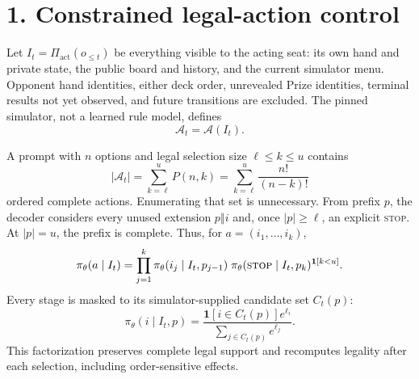 \section*{1. Constrained legal-action control}

Let $I_t=\Pi_{\mathrm{act}}(o_{\leq t})$ be everything visible to the acting
seat: its own hand and private state, the public board and history, and the
current simulator menu. Opponent hand identities, either deck order,
unrevealed Prize identities, terminal results not yet observed, and future
transitions are excluded. The pinned simulator, not a learned rule model,
defines
\[
  \mathcal A_t=\mathcal A(I_t).
\]

A prompt with $n$ options and legal selection size $\ell\leq k\leq u$
contains
\[
  |\mathcal A_t|
  =\sum_{k=\ell}^{u} P(n,k)
  =\sum_{k=\ell}^{u}\frac{n!}{(n-k)!}
\]
ordered complete actions. Enumerating that set is unnecessary. From prefix
$p$, the decoder considers every unused extension $p\mathbin{\Vert}i$ and,
once $|p|\geq\ell$, an explicit \textsc{stop}. At $|p|=u$, the prefix is
complete. Thus, for $a=(i_1,\ldots,i_k)$,
\[
 \pi_\theta(a\mid I_t)
 =\prod_{j=1}^{k}\pi_\theta(i_j\mid I_t,p_{j-1})
  \;\pi_\theta(\textsc{stop}\mid I_t,p_k)^{\mathbf 1[k<u]} .
\]
Every stage is masked to its simulator-supplied candidate set $C_t(p)$:
\[
 \pi_\theta(i\mid I_t,p)
 =\frac{\mathbf 1[i\in C_t(p)]e^{\ell_i}}
        {\sum_{j\in C_t(p)}e^{\ell_j}} .
\]
This factorization preserves complete legal support and recomputes legality
after each selection, including order-sensitive effects.
